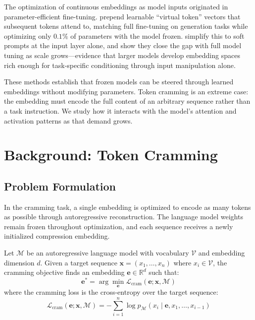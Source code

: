 \documentclass{article}
\theoremstyle{plain}
\theoremstyle{definition}
\theoremstyle{remark}
\begin{document}
The optimization of continuous embeddings as model inputs originated in parameter-efficient fine-tuning. \citet{li-liang-2021-prefix-tuning} prepend learnable ``virtual token'' vectors that subsequent tokens attend to, matching full fine-tuning on generation tasks while optimizing only $0.1\%$ of parameters with the model frozen. \citet{lester-etal-2021-prompt-tuning} simplify this to soft prompts at the input layer alone, and show they close the gap with full model tuning as scale grows---evidence that larger models develop embedding spaces rich enough for task-specific conditioning through input manipulation alone.

These methods establish that frozen models can be steered through learned embeddings without modifying parameters. Token cramming is an extreme case: the embedding must encode the full content of an arbitrary sequence rather than a task instruction. We study how it interacts with the model's attention and activation patterns as that demand grows.


\section{Background: Token Cramming}
\label{sec:background}

\subsection{Problem Formulation}

In the cramming task, a single embedding is optimized to encode as many tokens as possible through autoregressive reconstruction. The language model weights remain frozen throughout optimization, and each sequence receives a newly initialized compression embedding.

Let $\mathcal{M}$ be an autoregressive language model with vocabulary $\mathcal{V}$ and embedding dimension $d$.
Given a target sequence $\mathbf{x} = (x_1, \ldots, x_n)$ where $x_i \in \mathcal{V}$, the cramming objective finds an embedding $\mathbf{e} \in \mathbb{R}^d$ such that:
%
\begin{equation}
    \mathbf{e}^* = \arg\min_{\mathbf{e}} \mathcal{L}_{\text{cram}}(\mathbf{e}; \mathbf{x}, \mathcal{M})
\end{equation}
%
where the cramming loss is the cross-entropy over the target sequence:
%
\begin{equation}
    \mathcal{L}_{\text{cram}}(\mathbf{e}; \mathbf{x}, \mathcal{M}) = -\sum_{i=1}^{n} \log p_{\mathcal{M}}(x_i \mid \mathbf{e}, x_1, \ldots, x_{i-1})
\end{equation}
\end{document}
